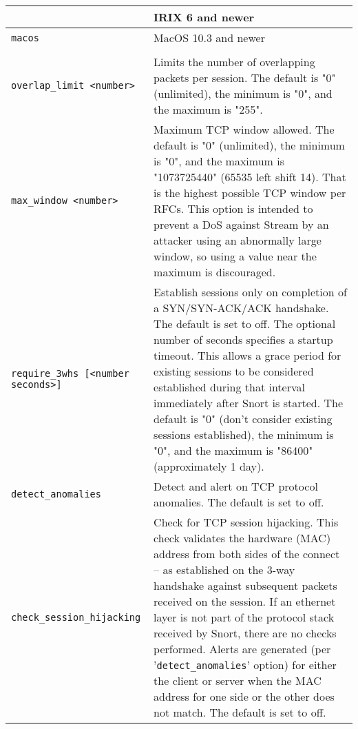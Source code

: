 \documentclass[english]{report}
\begin{document}
\begin{longtable}[h]{| p{2in} | p{4in} |}
\begin{tabular}{| l | p{2.5in} |}
\hline
\texttt{irix} & IRIX 6 and newer\\

\hline
\texttt{macos} & MacOS 10.3 and newer\\

\hline
\end{tabular}\\

\hline
\texttt{overlap\_limit <number>} &

Limits the number of overlapping packets per session.  The default is "0"
(unlimited), the minimum is "0", and the maximum is "255".\\

\hline
\texttt{max\_window <number>} &

Maximum TCP window allowed.  The default is "0" (unlimited), the minimum is
"0", and the maximum is "1073725440" (65535 left shift 14).  That is the
highest possible TCP window per RFCs.  This option is intended to prevent a DoS
against Stream by an attacker using an abnormally large window, so using a
value near the maximum is discouraged.\\

\hline
\texttt{require\_3whs [<number seconds>]} &

Establish sessions only on completion of a SYN/SYN-ACK/ACK handshake.  The
default is set to off.  The optional number of seconds specifies a startup
timeout.  This allows a grace period for existing sessions to be considered
established during that interval immediately after Snort is started.  The
default is "0" (don't consider existing sessions established), the minimum is
"0", and the maximum is "86400" (approximately 1 day).\\

\hline
\texttt{detect\_anomalies} &

Detect and alert on TCP protocol anomalies.  The default is set to off.\\

\hline
\texttt{check\_session\_hijacking} &

Check for TCP session hijacking.  This check validates the hardware (MAC)
address from both sides of the connect -- as established on the 3-way handshake
against subsequent packets received on the session.  If an ethernet layer is
not part of the protocol stack received by Snort, there are no checks
performed.  Alerts are generated (per '\texttt{detect\_anomalies}' option) for
either the client or server when the MAC address for one side or the other does
not match.  The default is set to off.\\


\end{longtable}
\end{document}
